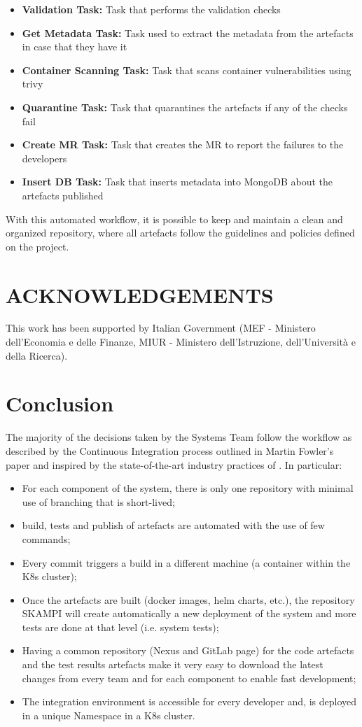 \documentclass[a4paper,
               keeplastbox,   %
               ]{jacow}
\begin{document}
\begin{itemize}
    \item \textbf{Validation Task:} Task that performs the validation checks 
    \item \textbf{Get Metadata Task:} Task used to extract the metadata from the artefacts in case that they have it
    \item \textbf{Container Scanning Task:} Task that scans container vulnerabilities using trivy
    \item \textbf{Quarantine Task:} Task that quarantines the artefacts if any of the checks fail
    \item \textbf{Create MR Task:} Task that creates the MR to report the failures to the developers
    \item \textbf{Insert DB Task:} Task that inserts metadata into MongoDB about the artefacts published
\end{itemize}

With this automated workflow, it is possible to keep and maintain a clean and organized repository, where all artefacts follow the guidelines and policies defined on the project.



 \section{ACKNOWLEDGEMENTS}
 This work has been supported by Italian Government (MEF - Ministero dell'Economia e delle Finanze, MIUR - Ministero dell'Istruzione, dell'Università e della Ricerca).

\section{Conclusion}
The majority of the decisions taken by the Systems Team follow the workflow as described by the Continuous Integration process outlined in Martin Fowler’s paper and inspired by the state-of-the-art industry practices of \cite{DevOps, CI, CD}. In particular:
\begin{itemize}
    \item For each component of the system, there is only one repository with minimal use of branching that is short-lived;
    \item build, tests and publish of artefacts are automated with the use of few commands;
    \item Every commit triggers a build in a different machine (a container within the K8s cluster);
    \item Once the artefacts are built (docker images, helm charts, etc.), the repository SKAMPI will create automatically a new deployment of the system and more tests are done at that level (i.e. system tests);
    \item Having a common repository (Nexus and GitLab page) for the code artefacts and the test results artefacts make it very easy to download the latest changes from every team and for each component to enable fast development;
    \item The integration environment is accessible for every developer and, is deployed in a unique Namespace in a K8s cluster.
\end{itemize}
\end{document}
